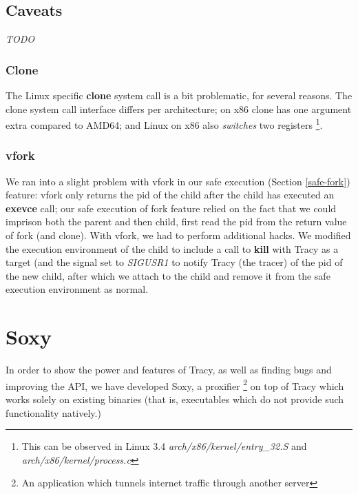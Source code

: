 \documentclass[a4paper, 10pt]{report}
\begin{document}
\section{Caveats}

\textit{TODO}

\subsection{Clone}

The Linux specific \textbf{clone} system call is a bit problematic, for
several reasons. The clone system call interface differs per architecture;
on x86 clone has one argument extra compared to AMD64; and Linux on x86
also \textit{switches} two registers
\footnote{This can be observed in Linux 3.4 \textit{arch/x86/kernel/entry\_32.S}
and \textit{arch/x86/kernel/process.c}}.


\subsection{vfork}

We ran into a slight problem with vfork in our safe execution (Section
\ref{safe-fork}) feature: vfork only returns the pid of the child after the
child has executed an \textbf{exevce} call; our safe execution of fork feature
relied on the fact that we could imprison both the parent and then child, first
read the pid from the return value of fork (and clone). With vfork, we had to
perform additional hacks. We modified the execution environment of the child
to include a call to \textbf{kill} with Tracy as a target (and the signal set to
\textit{SIGUSR1} to notify Tracy (the tracer) of the pid of the new child,
after which we attach to the child and remove it from the safe execution
environment as normal.

\chapter{Soxy}

\label{chapter:soxy}

In order to show the power and features of Tracy, as well as finding bugs and
improving the API, we have developed Soxy, a proxifier \footnote{An
application which tunnels internet traffic through another server} on top of
Tracy which works solely on existing binaries (that is, executables which do
not provide such functionality natively.)
\end{document}
